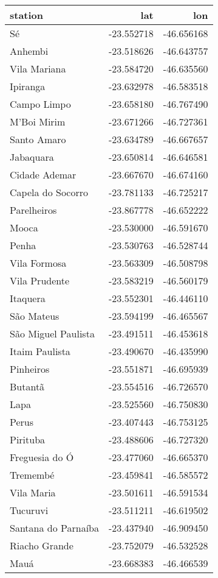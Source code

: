 \begin{tabular}{lrr}
\toprule
station & lat & lon \\
\midrule
Sé & -23.552718 & -46.656168 \\
Anhembi & -23.518626 & -46.643757 \\
Vila Mariana & -23.584720 & -46.635560 \\
Ipiranga & -23.632978 & -46.583518 \\
Campo Limpo & -23.658180 & -46.767490 \\
M'Boi Mirim & -23.671266 & -46.727361 \\
Santo Amaro & -23.634789 & -46.667657 \\
Jabaquara & -23.650814 & -46.646581 \\
Cidade Ademar & -23.667670 & -46.674160 \\
Capela do Socorro & -23.781133 & -46.725217 \\
Parelheiros & -23.867778 & -46.652222 \\
Mooca & -23.530000 & -46.591670 \\
Penha & -23.530763 & -46.528744 \\
Vila Formosa & -23.563309 & -46.508798 \\
Vila Prudente & -23.583219 & -46.560179 \\
Itaquera & -23.552301 & -46.446110 \\
São Mateus & -23.594199 & -46.465567 \\
São Miguel Paulista & -23.491511 & -46.453618 \\
Itaim Paulista & -23.490670 & -46.435990 \\
Pinheiros & -23.551871 & -46.695939 \\
Butantã & -23.554516 & -46.726570 \\
Lapa & -23.525560 & -46.750830 \\
Perus & -23.407443 & -46.753125 \\
Pirituba & -23.488606 & -46.727320 \\
Freguesia do Ó & -23.477060 & -46.665370 \\
Tremembé & -23.459841 & -46.585572 \\
Vila Maria & -23.501611 & -46.591534 \\
Tucuruvi & -23.511211 & -46.619502 \\
Santana do Parnaíba & -23.437940 & -46.909450 \\
Riacho Grande & -23.752079 & -46.532528 \\
Mauá & -23.668383 & -46.466539 \\
\bottomrule
\end{tabular}
